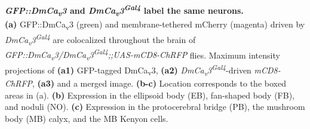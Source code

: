\label{fig:S1}
\textbf{\emph{GFP::DmCa\textsubscript{v}3} and \emph{DmCa\textsubscript{v}3\textsuperscript{Gal4}} label the same neurons.}
\\
\textbf{(a)} GFP::DmCa\textsubscript{v}3 (green) and membrane-tethered mCherry (magenta) driven by \emph{DmCa\textsubscript{v}3\textsuperscript{Gal4}} are colocalized throughout the brain of \emph{GFP::DmCa\textsubscript{v}3/DmCa\textsubscript{v}3\textsuperscript{Gal4};;UAS-mCD8-ChRFP} flies.
Maximum intensity projections of \textbf{(a1)} GFP-tagged DmCa\textsubscript{v}3, \textbf{(a2)} \emph{DmCa\textsubscript{v}3\textsuperscript{Gal4}}-driven \emph{mCD8-ChRFP}, \textbf{(a3)} and a merged image.
\textbf{(b-c)} Location corresponds to the boxed areas in (a).
\textbf{(b)} Expression in the ellipsoid body (EB), fan-shaped body (FB), and noduli (NO).
\textbf{(c)} Expression in the protocerebral bridge (PB), the mushroom body (MB) calyx, and the MB Kenyon cells.
  